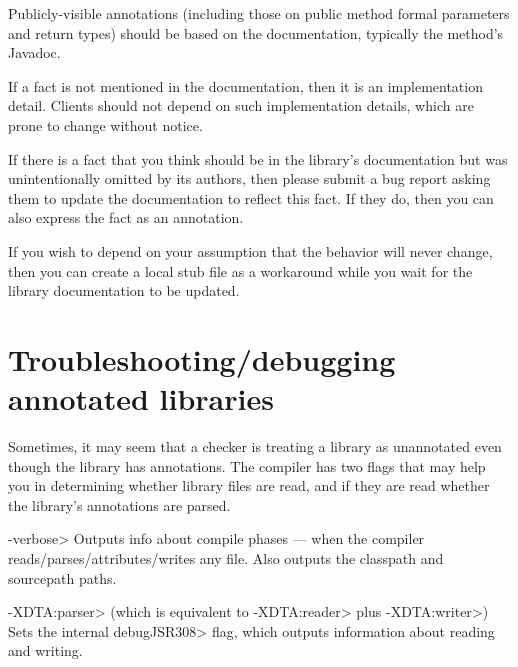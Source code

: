 Publicly-visible annotations (including those on public method formal
parameters and return types) should be based on the
documentation, typically the method's Javadoc.

If a fact is not mentioned in the documentation, then it is an
implementation detail.  Clients should not depend on such implementation
details, which are prone to change without notice.

If there is a fact that you think should be in the library's documentation
but was unintentionally omitted by its authors, then please submit a bug
report asking them to update the documentation to reflect this fact.  If
they do, then you can also express the fact as an annotation.

If you wish to depend on your assumption that the behavior will never
change, then you can create a local stub file as a workaround while you
wait for the library documentation to be updated.


\section{Troubleshooting/debugging annotated libraries\label{libraries-troubleshooting}}

Sometimes, it may seem that a checker is treating a library as unannotated
even though the library has annotations.  The compiler has two flags that
may help you in determining whether library files are read, and if they are
read whether the library's annotations are parsed.

\begin{description}
\item \<-verbose>
  Outputs info about compile phases --- when the compiler
  reads/parses/attributes/writes any file.  Also outputs the classpath and
  sourcepath paths.
\item \<-XDTA:parser> (which is equivalent to \<-XDTA:reader> plus \<-XDTA:writer>)
  Sets the internal \<debugJSR308> flag, which outputs information about
  reading and writing.
\end{description}


